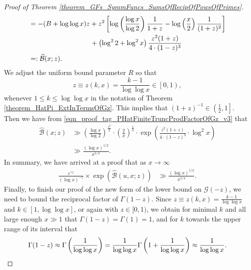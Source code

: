 \documentclass[11pt,reqno,a4letter]{article}
\numberwithin{figure}{section}
\numberwithin{table}{section}
\theoremstyle{plain}
\numberwithin{theorem}{section}
\theoremstyle{definition}
\begin{document}
\begin{proof}[Proof of Theorem \ref{theorem_GFs_SymmFuncs_SumsOfRecipOfPowsOfPrimes}]
\begin{align}
\label{eqn_proof_tag_PHatFiniteTruncProdFactorOfGz_v3} 
     & = -(B + \log\log x) z + z^2 \left[ 
     \log\left(\frac{\log x}{\log 2}\right) \frac{1}{1+z} - 
     \log\left(\frac{x}{2}\right) \frac{1}{(1+z)^2}\right] \\ 
\notag 
     & \phantom{= -(B + \log\log x) z\ } + 
     \left(\log^2 2 + \log^2 x\right) \frac{z^2 (1+z)}{4 \cdot (1-z)^3} \\ 
\notag 
     & =: \widehat{\mathcal{B}}(x; z). 
\end{align} 
We adjust the uniform bound parameter $R$ so that 
$$z \equiv z(k, x) = \frac{k-1}{\log\log x} \in \left[0, 1\right),$$ 
whenever $1 \leq k \leq \log\log x$ 
in the notation of Theorem \ref{theorem_HatPi_ExtInTermsOfGz}. 
This implies that $(1+z)^{-1} \in \left(\frac{1}{2}, 1\right]$. 
Then we have from \eqref{eqn_proof_tag_PHatFiniteTruncProdFactorOfGz_v3} that 
\begin{align*} 
\widehat{\mathcal{B}}(x; z) & \gg \left(\frac{\log x}{\log 2}\right)^{\frac{z^2}{2}} \cdot 
     \left(\frac{2}{x}\right)^{\frac{1}{4}} \cdot \exp\left( 
     \frac{z^2 (1+z)}{4 \cdot (1-z)^3} \cdot \log^2 x\right) \\ 
     & \gg \frac{(\log x)^{1/2}}{x^{1/4}}. 
\end{align*} 
In summary, we have arrived at a proof that 
as $x \rightarrow \infty$
\begin{align} 
\label{eqn_proof_tag_simpl_v1} 
\frac{e^{\gamma z}}{(\log x)^{-z}} \times \exp\left(\widehat{\mathcal{B}}(u, x; z)\right) & \gg 
     \frac{(\log x)^{1/2}}{x^{1/4}}. 
\end{align} 
Finally, to finish our proof of the new form of the lower bound on $\mathcal{G}(-z)$, 
we need to bound the reciprocal factor of $\Gamma(1-z)$. 
Since $z \equiv z(k, x) = \frac{k-1}{\log\log x}$ and 
$k \in [1, \log\log x]$, or again with $z \in [0, 1)$, 
we obtain for minimal $k$ and all large enough $x \gg 1$ that 
$\Gamma(1-z) = \Gamma(1) = 1$, and for $k$ towards the upper range of 
its interval that 
\[
\Gamma(1-z) \approx \Gamma\left(\frac{1}{\log\log x}\right) = 
     \frac{1}{\log\log x} \Gamma\left(1 + \frac{1}{\log\log x}\right) 
     \approx \frac{1}{\log\log x}. 
     \qedhere 
\]
\end{proof} 
\end{document}
